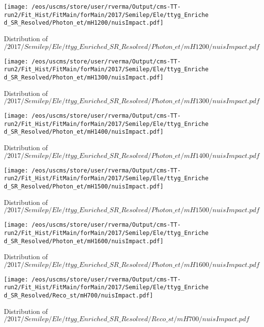 \begin{figure}
\centering
\texttt{[image: /eos/uscms/store/user/rverma/Output/cms-TT-run2/Fit\_Hist/FitMain/forMain/2017/Semilep/Ele/ttyg\_Enriched\_SR\_Resolved/Photon\_et/mH1200/nuisImpact.pdf]}
\caption{Distribution of $/2017/Semilep/Ele/ttyg\_Enriched\_SR\_Resolved/Photon\_et/mH1200/nuisImpact.pdf$}
\end{figure}

\begin{figure}
\centering
\texttt{[image: /eos/uscms/store/user/rverma/Output/cms-TT-run2/Fit\_Hist/FitMain/forMain/2017/Semilep/Ele/ttyg\_Enriched\_SR\_Resolved/Photon\_et/mH1300/nuisImpact.pdf]}
\caption{Distribution of $/2017/Semilep/Ele/ttyg\_Enriched\_SR\_Resolved/Photon\_et/mH1300/nuisImpact.pdf$}
\end{figure}

\begin{figure}
\centering
\texttt{[image: /eos/uscms/store/user/rverma/Output/cms-TT-run2/Fit\_Hist/FitMain/forMain/2017/Semilep/Ele/ttyg\_Enriched\_SR\_Resolved/Photon\_et/mH1400/nuisImpact.pdf]}
\caption{Distribution of $/2017/Semilep/Ele/ttyg\_Enriched\_SR\_Resolved/Photon\_et/mH1400/nuisImpact.pdf$}
\end{figure}

\begin{figure}
\centering
\texttt{[image: /eos/uscms/store/user/rverma/Output/cms-TT-run2/Fit\_Hist/FitMain/forMain/2017/Semilep/Ele/ttyg\_Enriched\_SR\_Resolved/Photon\_et/mH1500/nuisImpact.pdf]}
\caption{Distribution of $/2017/Semilep/Ele/ttyg\_Enriched\_SR\_Resolved/Photon\_et/mH1500/nuisImpact.pdf$}
\end{figure}

\begin{figure}
\centering
\texttt{[image: /eos/uscms/store/user/rverma/Output/cms-TT-run2/Fit\_Hist/FitMain/forMain/2017/Semilep/Ele/ttyg\_Enriched\_SR\_Resolved/Photon\_et/mH1600/nuisImpact.pdf]}
\caption{Distribution of $/2017/Semilep/Ele/ttyg\_Enriched\_SR\_Resolved/Photon\_et/mH1600/nuisImpact.pdf$}
\end{figure}

\begin{figure}
\centering
\texttt{[image: /eos/uscms/store/user/rverma/Output/cms-TT-run2/Fit\_Hist/FitMain/forMain/2017/Semilep/Ele/ttyg\_Enriched\_SR\_Resolved/Reco\_st/mH700/nuisImpact.pdf]}
\caption{Distribution of $/2017/Semilep/Ele/ttyg\_Enriched\_SR\_Resolved/Reco\_st/mH700/nuisImpact.pdf$}
\end{figure}


